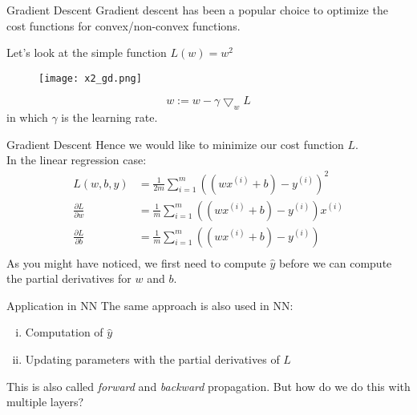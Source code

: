 \documentclass{beamer}
\begin{document}
\begin{frame}[t]{Gradient Descent}
  Gradient descent has been a popular choice to optimize the cost functions for convex/non-convex functions.

  Let's look at the simple function $L(w) = w^2$
  \begin{figure}[htpb]
    \centering
    \texttt{[image: x2\_gd.png]}
  \end{figure}
  \begin{equation}
    w := w - \gamma \bigtriangledown_wL
  \end{equation}
  in which $\gamma$ is the learning rate.
\end{frame}

\begin{frame}[t]{Gradient Descent}
  Hence we would like to minimize our cost function $L$.
  \\
  In the linear regression case:
  \begin{equation}
    \begin{align*}
      L(w, b, y) &= \frac{1}{2m} \sum^m_{i=1} ((wx^{(i)}+b) - y^{(i)})^2 \\
      \frac{\partial L}{\partial w} &= \frac{1}{m} \sum^m_{i=1} ((wx^{(i)}+b) - y^{(i)})x^{(i)} \\
      \frac{\partial L}{\partial b} &= \frac{1}{m} \sum^m_{i=1} ((wx^{(i)}+b) - y^{(i)}) \\
    \end{align}
  \end{equation}
  As you might have noticed, we first need to compute $\hat{y}$ before we can compute the partial derivatives for $w$ and $b$.
\end{frame}

\begin{frame}[t]{Application in NN}
  The same approach is also used in NN:
  \begin{enumerate}[(i)]
    \item Computation of $\hat{y}$ 
    \item Updating parameters with the partial derivatives of $L$
  \end{enumerate}
  This is also called \emph{forward} and \emph{backward} propagation.
  But how do we do this with multiple layers?
\end{frame}
\end{document}
